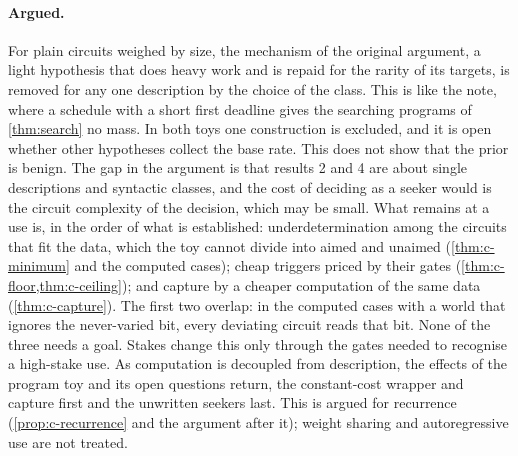 \paragraph{Argued.} For plain circuits weighed by size, the mechanism of the original argument, a light
hypothesis that does heavy work and is repaid for the rarity of its targets, is removed for any one
description by the choice of the class. This is like the note, where a schedule with a short first deadline
gives the searching programs of \cref{thm:search} no mass. In both toys one construction is excluded, and it
is open whether other hypotheses collect the base rate. This does not show that the prior is benign. The gap
in the argument is that results 2 and 4 are about single descriptions and syntactic classes, and the cost of
deciding as a seeker would is the circuit complexity of the decision, which may be small. What remains at a
use is, in the order of what is established: underdetermination among the circuits that fit the data, which
the toy cannot divide into aimed and unaimed (\cref{thm:c-minimum} and the computed cases); cheap triggers
priced by their gates (\cref{thm:c-floor,thm:c-ceiling}); and capture by a cheaper computation of the same
data (\cref{thm:c-capture}). The first two overlap: in the computed cases with a world that ignores the
never-varied bit, every deviating circuit reads that bit. None of the three needs a goal. Stakes change this
only through the gates needed to recognise a high-stake use. As computation is decoupled from description, the
effects of the program toy and its open questions return, the constant-cost wrapper and capture first and the
unwritten seekers last. This is argued for recurrence (\cref{prop:c-recurrence} and the argument after it);
weight sharing and autoregressive use are not treated.

